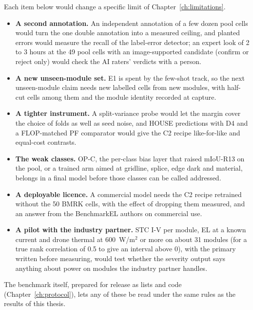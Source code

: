Each item below would change a specific limit of Chapter~\ref{ch:limitations}.
\begin{itemize}
  \item \textbf{A second annotation.} An independent annotation of a few dozen pool cells would turn the one double annotation into
  a measured ceiling, and planted errors would measure the recall of the label-error detector; an expert look of 2 to 3 hours at
  the 49 pool cells with an image-supported candidate (confirm or reject only) would check the AI raters' verdicts with a person.
  \item \textbf{A new unseen-module set.} E1 is spent by the few-shot track, so the next unseen-module claim needs new labelled
  cells from new modules, with half-cut cells among them and the module identity recorded at capture.
  \item \textbf{A tighter instrument.} A split-variance probe would let the margin cover the choice of folds as well as seed noise,
  and HOUSE predictions with D4 and a FLOP-matched PF comparator would give the C2 recipe like-for-like and equal-cost contrasts.
  \item \textbf{The weak classes.} OP-C, the per-class bias layer that raised mIoU-R13 on the pool, or a trained arm aimed at
  gridline, splice, edge dark and material, belongs in a final model before those classes can be called addressed.
  \item \textbf{A deployable licence.} A commercial model needs the C2 recipe retrained without the 50 BMRK cells, with the effect of
  dropping them measured, and an answer from the BenchmarkEL authors on commercial use.
  \item \textbf{A pilot with the industry partner.} STC I-V per module, EL at a known current and drone thermal at 600~W/m$^2$ or more on about
  31 modules (for a true rank correlation of 0.5 to give an interval above 0), with the primary written before measuring, would
  test whether the severity output says anything about power on modules the industry partner handles.
\end{itemize}
The benchmark itself, prepared for release as lists and code (Chapter~\ref{ch:protocol}), lets any of these be read under the same rules as
the results of this thesis.
